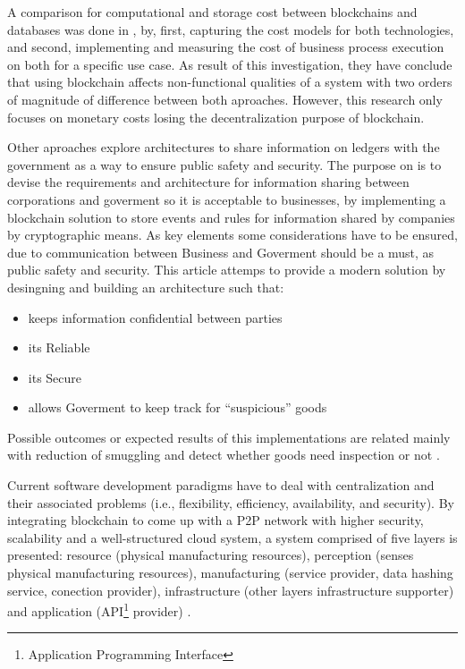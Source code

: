 \documentclass[runningheads]{llncs}
\begin{document}
A comparison for computational and storage cost between blockchains and databases was done in \cite{Rimba2017}, by, first, capturing the cost models for both technologies, and second, implementing and measuring the cost of business process execution on both for a specific use case. As result of this investigation, they have conclude that using blockchain affects non-functional qualities of a system with two orders of magnitude of difference between both aproaches. However, this research only focuses on monetary costs losing the decentralization purpose of blockchain.

Other aproaches explore architectures to share information on ledgers with the government as a way to ensure public safety and security. The purpose on \cite{Engelenburg2017} is to devise the requirements and architecture for information sharing between corporations and goverment so it is acceptable to businesses, by implementing a blockchain solution to store events and rules for information shared by companies by cryptographic means. As key elements some considerations have to be ensured, due to communication between Business and Goverment should be a must, as public safety and security. This article attemps to provide a modern solution by desingning and building an architecture such that:
\begin{itemize}
	\item keeps information confidential between parties
	\item its Reliable
	\item its Secure
	\item allows Goverment to keep track for ``suspicious'' goods
\end{itemize}

Possible outcomes or expected results of this implementations are related mainly with reduction of smuggling and detect whether goods need inspection or not \cite{Engelenburg2017}.

Current software development paradigms have to deal with centralization and their associated problems (i.e., flexibility, efficiency, availability, and security). By integrating blockchain to come up with a P2P network with higher security, scalability and a well-structured cloud system, a system comprised of five layers is presented: resource (physical manufacturing resources), perception (senses physical manufacturing resources), manufacturing (service provider, data hashing service, conection provider), infrastructure (other layers infrastructure supporter) and application (API\footnote{Application Programming Interface} provider) \cite{Li2018c}.
\end{document}

